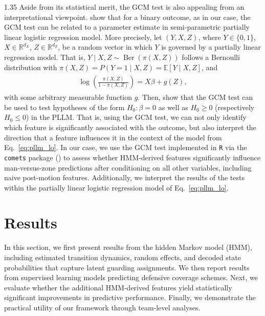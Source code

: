 \documentclass[12pt,a4paper]{article}
\newcommand{\given}{\mid}
\begin{document}
\begin{spacing}{1.35}
Aside from its statistical merit, the GCM test is also appealing from an interpretational viewpoint. \citet{bajons2025rGAX} show that for a binary outcome, as in our case, the GCM test can be related to a parameter estimate in semi-parametric partially linear logistic regression model.
More precisely, let $(Y, X, Z)$, where $Y \in \{0, 1\}$, $X \in \mathbb{R}^{d_X}$, $Z \in \mathbb{R}^{d_Z}$, be a random vector in which $Y$ is governed by a partially linear regression model. That is, $Y \given X, Z \sim \operatorname{Ber}(\pi(X,Z))$
follows a Bernoulli distribution with $\pi(X,Z) = P(Y=1 \mid X,Z) = \mathbb{E}[Y \given
X,Z]$, and 
\begin{align}
\label{eq:pllm_lo}
\begin{aligned}
\log\left(\frac{\pi(X,Z)}{1-\pi(X,Z)}\right) =
X\beta + g(Z),
\end{aligned}
\end{align}
with some arbitrary measurable function $g$. Then, \citet{bajons2025rGAX} show that the GCM test can be used to test hypotheses of the form $H_0: \beta = 0$ as well as $H_0 \ge 0$ (respectively $H_0 \le 0$) in the PLLM.  
That is, using the GCM test, we can not only identify which feature is significantly associated with the outcome, but also interpret the direction that a feature influences it in the context of the model from Eq.~\ref{eq:pllm_lo}. In our case, we use the GCM test implemented in \texttt{R} via the \texttt{comets} package (\citealp{kook24comets}) to assess whether HMM-derived features significantly influence man-versus-zone predictions after conditioning on all other variables, including naive post-motion features. Additionally, we interpret the results of the tests within the partially linear logistic regression model of Eq.~\ref{eq:pllm_lo}.

\section{Results}\label{sec:results}
In this section, we first present results from the hidden Markov model (HMM), including estimated transition dynamics, random effects, and decoded state probabilities that capture latent guarding assignments. We then report results from supervised learning models predicting defensive coverage schemes. Next, we evaluate whether the additional HMM-derived features yield statistically significant improvements in predictive performance. Finally, we demonstrate the practical utility of our framework through team-level analyses.


\end{spacing}
\end{document}

